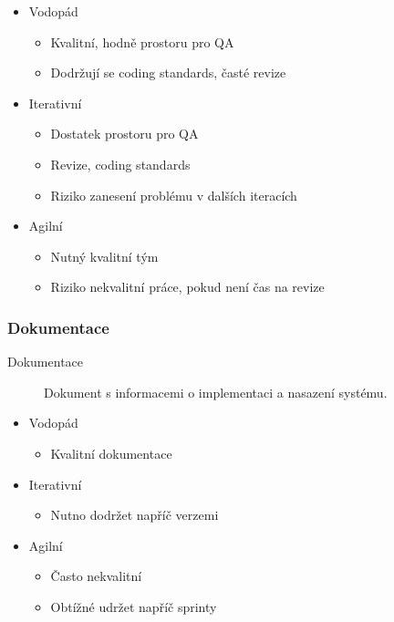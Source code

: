            \begin{itemize}
              \item Vodopád
                \begin{itemize}
                  \item Kvalitní, hodně prostoru pro QA
                  \item Dodržují se coding standards, časté revize
                \end{itemize}
              \item Iterativní
                \begin{itemize}
                  \item Dostatek prostoru pro QA
                  \item Revize, coding standards
                  \item Riziko zanesení problému v dalších iteracích
                \end{itemize}
              \item Agilní
                \begin{itemize}
                  \item Nutný kvalitní tým
                  \item Riziko nekvalitní práce, pokud není čas na revize
                \end{itemize}
            \end{itemize}

            \subsubsection{Dokumentace}
              \begin{description}
                \item[Dokumentace] Dokument s informacemi o implementaci a nasazení systému.
              \end{description}

              \begin{itemize}
                \item Vodopád
                  \begin{itemize}
                    \item Kvalitní dokumentace
                  \end{itemize}
                \item Iterativní
                  \begin{itemize}
                    \item Nutno dodržet napříč verzemi
                  \end{itemize}
                \item Agilní
                  \begin{itemize}
                    \item Často nekvalitní
                    \item Obtížné udržet napříč sprinty
                  \end{itemize}
              \end{itemize}

